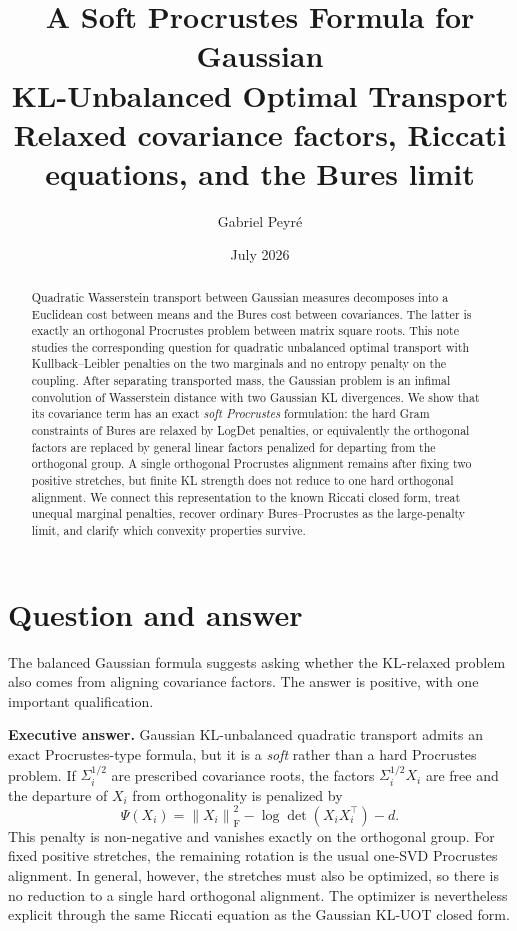 \documentclass[11pt]{article}
\title{\textbf{A Soft Procrustes Formula for Gaussian\\
KL-Unbalanced Optimal Transport}\\
\large Relaxed covariance factors, Riccati equations, and the Bures limit}
\author{Gabriel Peyr\'e}
\date{July 2026}
\theoremstyle{definition}
\theoremstyle{remark}
\newcommand{\norm}[1]{\left\lVert #1\right\rVert}
\begin{document}
\maketitle

\begin{abstract}
Quadratic Wasserstein transport between Gaussian measures decomposes into a
Euclidean cost between means and the Bures cost between covariances. The latter
is exactly an orthogonal Procrustes problem between matrix square roots. This
note studies the corresponding question for quadratic unbalanced optimal
transport with Kullback--Leibler penalties on the two marginals and no entropy
penalty on the coupling. After separating transported mass, the Gaussian
problem is an infimal convolution of Wasserstein distance with two Gaussian KL
divergences. We show that its covariance term has an exact \emph{soft
Procrustes} formulation: the hard Gram constraints of Bures are relaxed by
LogDet penalties, or equivalently the orthogonal factors are replaced by
general linear factors penalized for departing from the orthogonal group. A
single orthogonal Procrustes alignment remains after fixing two positive
stretches, but finite KL strength does not reduce to one hard orthogonal
alignment. We connect this representation to the known Riccati closed form,
treat unequal marginal penalties, recover ordinary Bures--Procrustes as the
large-penalty limit, and clarify which convexity properties survive.
\end{abstract}

\section{Question and answer}

The balanced Gaussian formula suggests asking whether the KL-relaxed problem
also comes from aligning covariance factors. The answer is positive, with one
important qualification.

\medskip
\noindent
\colorbox{warmgray}{\parbox{0.95\linewidth}{
\textbf{Executive answer.}
Gaussian KL-unbalanced quadratic transport admits an exact Procrustes-type
formula, but it is a \emph{soft} rather than a hard Procrustes problem. If
$\Sigma_i^{1/2}$ are prescribed covariance roots, the factors
$\Sigma_i^{1/2}X_i$ are free and the departure of $X_i$ from orthogonality is
penalized by
\[
  \Psi(X_i)=\norm{X_i}_{\mathrm F}^2
  -\log\det(X_iX_i^\top)-d.
\]
This penalty is non-negative and vanishes exactly on the orthogonal group.
For fixed positive stretches, the remaining rotation is the usual one-SVD
Procrustes alignment. In general, however, the stretches must also be
optimized, so there is no reduction to a single hard orthogonal alignment.
The optimizer is nevertheless explicit through the same Riccati equation as
the Gaussian KL-UOT closed form.}}
\medskip
\end{document}
